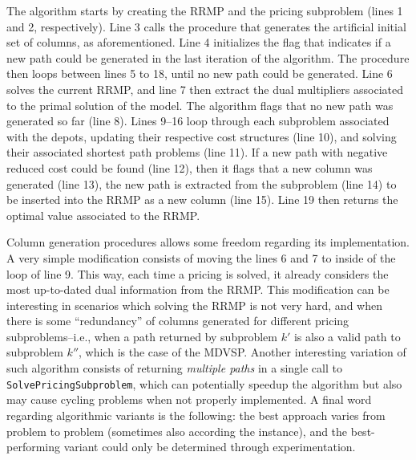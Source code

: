 \documentclass{article}
\begin{document}
The algorithm starts by creating the RRMP and the pricing subproblem (lines 1 and 2, respectively). Line 3 calls the procedure that generates the artificial initial set of columns, as aforementioned. Line 4 initializes the flag that indicates if a new path could be generated in the last iteration of the algorithm. The procedure then loops between lines 5 to 18, until no new path could be generated. Line 6 solves the current RRMP, and line 7 then extract the dual multipliers associated to the primal solution of the model. The algorithm flags that no new path was generated so far (line 8). Lines 9--16 loop through each subproblem associated with the depots, updating their respective cost structures (line 10), and solving their associated shortest path problems (line 11). If a new path with negative reduced cost could be found (line 12), then it flags that a new column was generated (line 13), the new path is extracted from the subproblem (line 14) to be inserted into the RRMP as a new column (line 15). Line 19 then returns the optimal value associated to the RRMP.

Column generation procedures allows some freedom regarding its implementation. A very simple modification consists of moving the lines 6 and 7 to inside of the loop of line 9. This way, each time a pricing is solved, it already considers the most up-to-dated dual information from the RRMP. This modification can be interesting in scenarios which solving the RRMP is not very hard, and when there is some ``redundancy'' of columns generated for different pricing subproblems--i.e., when a path returned by subproblem $k'$ is also a valid path to subproblem $k''$, which is the case of the MDVSP. Another interesting variation of such algorithm consists of returning \textit{multiple paths} in a single call to \texttt{SolvePricingSubproblem}, which can potentially speedup the algorithm but also may cause cycling problems when not properly implemented. A final word regarding algorithmic variants is the following: the best approach varies from problem to problem (sometimes also according the instance), and the best-performing variant could only be determined through experimentation.
\end{document}
